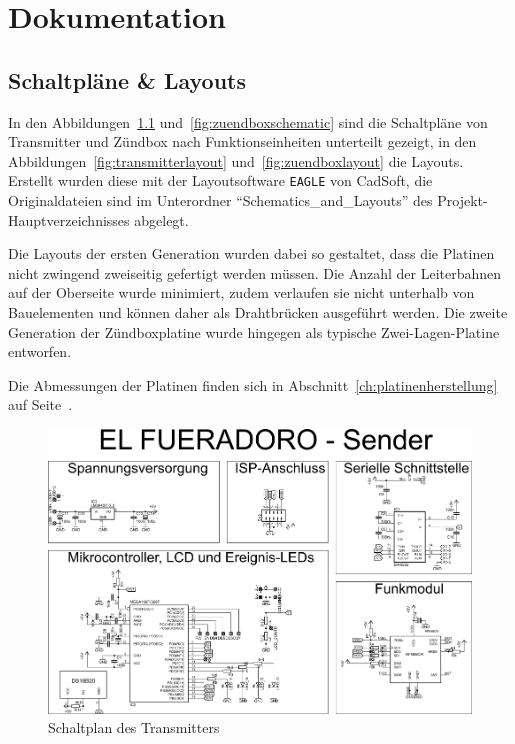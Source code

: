 \documentclass[paper=a4, parskip, numbers=noenddot, toc=listof, headsepline]{scrbook}
\begin{document}
	\part{Dokumentation}
		\label{part:dokumentation}

		\chapter{Schaltpläne \& Layouts}

		 In den Abbildungen~\ref{fig:transmitterschematic} und~\ref{fig:zuendboxschematic} sind die Schaltpläne von Transmitter und Zündbox nach Funk\-tions\-ein\-heiten unterteilt gezeigt, in den Abbildungen~\ref{fig:transmitterlayout} und~\ref{fig:zuendboxlayout} die Layouts. Erstellt wurden diese mit der Layoutsoftware \texttt{EAGLE} von CadSoft, die Originaldateien sind im Unterordner \enquote{Schematics\_and\_Layouts} des Projekt-Hauptverzeichnisses abgelegt.

		 Die Layouts der ersten Generation wurden dabei so gestaltet, dass die Platinen nicht zwingend zweiseitig gefertigt werden müssen. Die Anzahl der Leiterbahnen auf der Oberseite wurde minimiert, zudem verlaufen sie nicht unterhalb von Bauelementen und können daher als Drahtbrücken ausgeführt werden. Die zweite Generation der Zündboxplatine wurde hingegen als typische Zwei-Lagen-Platine entworfen.

		 Die Abmessungen der Platinen finden sich in Abschnitt~\ref{ch:platinenherstellung} auf Seite~\pageref{ch:platinenherstellung}.

		 \begin{figure}
			 \centering
			 \includegraphics[angle=-90, width=.9\textwidth, keepaspectratio]{Bilder/Transmitterschaltplan}
			 \caption{Schaltplan des Transmitters}
			 \label{fig:transmitterschematic}
		 \end{figure}
\end{document}
